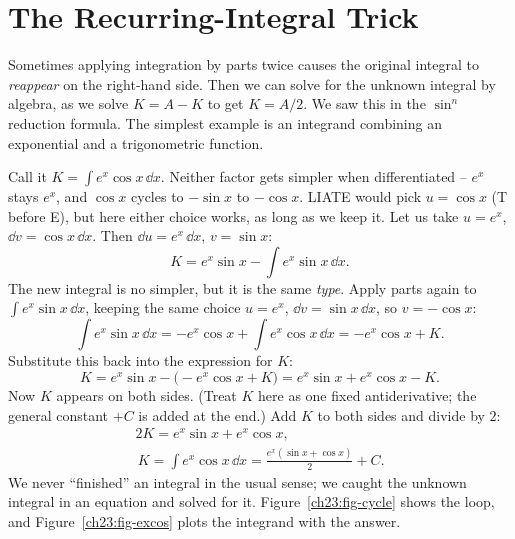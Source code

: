 \section{The Recurring-Integral Trick}
\label{ch23:recurring}

Sometimes applying integration by parts twice causes the original integral to
\emph{reappear} on the right-hand side. Then we can solve for the unknown
integral by algebra, as we solve $K = A - K$ to get $K = A/2$. We saw this in
the $\sin^n$ reduction formula. The simplest example is an integrand combining
an exponential and a trigonometric function.

\begin{example}
\label{ch23:ex-excos}
Call it $K = \int e^x\cos x\,\dd x$. Neither factor gets simpler when
differentiated -- $e^x$ stays $e^x$, and $\cos x$ cycles to $-\sin x$ to
$-\cos x$. LIATE would pick $u=\cos x$ (T before E), but here either choice
works, as long as we keep it. Let us take $u = e^x$, $\dd v = \cos x\,\dd x$. Then
$\dd u = e^x\,\dd x$, $v = \sin x$:
\[
K = e^x\sin x - \int e^x\sin x\,\dd x.
\]
The new integral is no simpler, but it is the same \emph{type}. Apply parts again
to $\int e^x\sin x\,\dd x$, keeping the same choice $u = e^x$,
$\dd v = \sin x\,\dd x$, so $v = -\cos x$:
\[
\int e^x\sin x\,\dd x = -e^x\cos x + \int e^x\cos x\,\dd x = -e^x\cos x + K.
\]
Substitute this back into the expression for $K$:
\[
K = e^x\sin x - \big(-e^x\cos x + K\big) = e^x\sin x + e^x\cos x - K.
\]
Now $K$ appears on both sides. (Treat $K$ here as one fixed antiderivative; the
general constant $+C$ is added at the end.) Add $K$ to both sides and divide by $2$:
\begin{gather*}
2K = e^x\sin x + e^x\cos x,\\
\boxed{\,K = \int e^x\cos x\,\dd x = \frac{e^x(\sin x + \cos x)}{2} + C.}
\end{gather*}
We never ``finished'' an integral in the usual sense; we caught the unknown
integral in an equation and solved for it. Figure~\ref{ch23:fig-cycle} shows the
loop, and Figure~\ref{ch23:fig-excos} plots the integrand with the answer.
\end{example}

